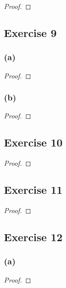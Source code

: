 \documentclass[14pt]{extarticle}
\begin{document}
\begin{proof}

\end{proof}

\subsection{Exercise 9}

\subsubsection{(a)}

\begin{proof}

\end{proof}

\subsubsection{(b)}

\begin{proof}

\end{proof}

\subsection{Exercise 10}

\begin{proof}

\end{proof}

\subsection{Exercise 11}

\begin{proof}

\end{proof}

\subsection{Exercise 12}

\subsubsection{(a)}

\begin{proof}

\end{proof}
\end{document}
